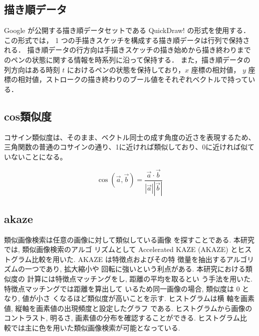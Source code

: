 \documentclass[twocolumn]{jarticle}     %
\begin{document}
	\subsection{描き順データ}
		Google が公開する描き順データセットである QuickDraw! \cite{Cheema:2012:QID:2207676.2208550} の形式を使用する．
		この形式では， 1 つの手描きスケッチを構成する描き順データは行列で保持される．
		描き順データの行方向は手描きスケッチの描き始めから描き終わりまでのペンの状態に関する情報を時系列に沿って保持する．
		また，描き順データの列方向はある時刻 $t$ におけるペンの状態を保持しており，$x$ 座標の相対値， $y$ 座標の相対値，ストロークの描き終わりのブール値をそれぞれベクトルで持っている．

    \subsection{cos類似度}
コサイン類似度は、そのまま、ベクトル同士の成す角度の近さを表現するため、三角関数の普通のコサインの通り、1に近ければ類似しており、0に近ければ似ていないことになる。

\begin{equation}
  \cos( \overrightarrow{a}, \overrightarrow{b} ) =
  \frac{\overrightarrow{a} \cdot \overrightarrow{b}}{|\overrightarrow{a}| |\overrightarrow{b}|}
\end{equation}

    \subsection{akaze}
類似画像検索は任意の画像に対して類似している画像
を探すことである. 本研究では, 類似画像検索のアルゴ
リズムとして Accelerated KAZE (AKAZE) \cite{alcantarilla2011fast} とヒス
トグラム比較を用いた. AKAZE は特徴点およびその特
徴量を抽出するアルゴリズムの一つであり, 拡大縮小や
回転に強いという利点がある. 本研究における類似度の
計算には特徴点マッチングをし, 距離の平均を取るとい
う手法を用いた. 特徴点マッチングでは距離を算出して
いるため同一画像の場合, 類似度は 0 となり, 値が小さ
くなるほど類似度が高いことを示す. ヒストグラムは横
軸を画素値, 縦軸を画素値の出現頻度と設定したグラフ
である. ヒストグラムから画像のコントラスト, 明るさ,
画素値の分布を確認することができる. ヒストグラム比
較では主に色を用いた類似画像検索が可能となっている.
\end{document}
